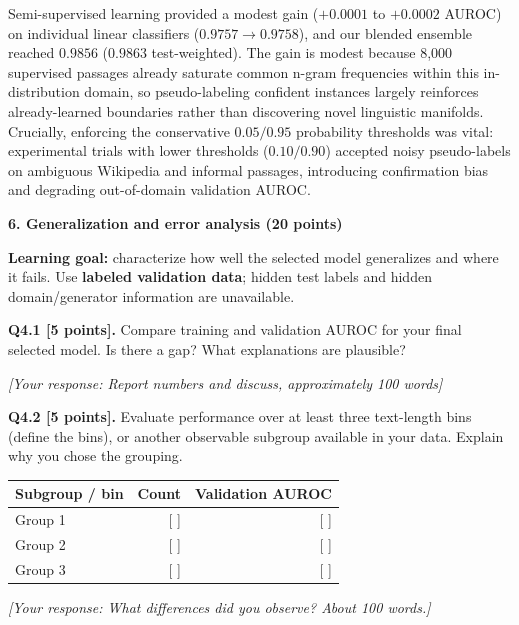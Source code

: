 \documentclass[11pt,letterpaper]{article}
\begin{document}
Semi-supervised learning provided a modest gain ($+0.0001$ to $+0.0002$ AUROC) on individual linear classifiers ($0.9757 \to 0.9758$), and our blended ensemble reached $0.9856$ ($0.9863$ test-weighted). The gain is modest because 8,000 supervised passages already saturate common n-gram frequencies within this in-distribution domain, so pseudo-labeling confident instances largely reinforces already-learned boundaries rather than discovering novel linguistic manifolds. Crucially, enforcing the conservative $0.05 / 0.95$ probability thresholds was vital: experimental trials with lower thresholds ($0.10 / 0.90$) accepted noisy pseudo-labels on ambiguous Wikipedia and informal passages, introducing confirmation bias and degrading out-of-domain validation AUROC.

\newpage
{\large\textbf{6. Generalization and error analysis (20 points)}}
\vspace{2pt}

\textbf{Learning goal:} characterize how well the selected model generalizes and where it fails. Use \textbf{labeled validation data}; hidden test labels and hidden domain/generator information are unavailable.

\vspace{6pt}
\textbf{Q4.1 [5 points].} Compare training and validation AUROC for your final selected model. Is there a gap? What explanations are plausible?

\textit{[Your response: Report numbers and discuss, approximately 100 words]}

\vspace{8pt}
\textbf{Q4.2 [5 points].} Evaluate performance over at least three text-length bins (define the bins), or another observable subgroup available in your data. Explain why you chose the grouping.

\vspace{2pt}
\begin{tabularx}{0.7\textwidth}{@{}lrr@{}}
\toprule
\textbf{Subgroup / bin} & \textbf{Count} & \textbf{Validation AUROC} \\
\midrule
Group 1 & [ ] & [ ] \\
Group 2 & [ ] & [ ] \\
Group 3 & [ ] & [ ] \\
\bottomrule
\end{tabularx}

\vspace{2pt}
\textit{[Your response: What differences did you observe? About 100 words.]}
\end{document}
